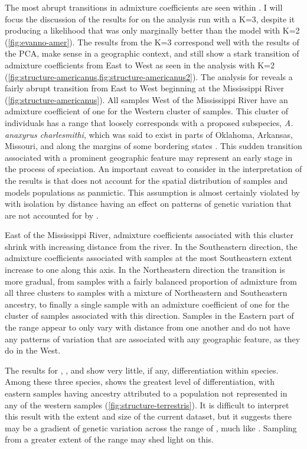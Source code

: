The most abrupt transitions in admixture coefficients are seen within \amer.
I will focus the discussion of the \structure results for \amer on the 
analysis run with a K=3, despite it producing a likelihood that was only 
marginally better than the model with K=2 (\cref{fig:evanno-amer}).
The results from the K=3 correspond well with the results of 
the PCA, make sense in a geographic context, and still show a stark 
transition of admixture coefficients from East to West as seen in the analysis 
with K=2 (\cref{fig:structure-americanus,fig:structure-americanus2}).
The \structure analysis for \amer reveals a fairly abrupt transition from East
to West beginning at the Mississippi River (\cref{fig:structure-americanus}).
All samples West of the Mississippi River have an admixture coefficient of one for the 
Western cluster of samples.
This cluster of individuals has a range that loosely corresponds with a proposed
subspecies, \textit{A. anaxyrus charlesmithi}, which was said to exist in parts  
of Oklahoma, Arkansas, Missouri, and along the margins of some bordering states 
\parencite{bragg1954}.
This sudden transition associated with a prominent geographic feature 
may represent an early stage in the process of speciation.
An important caveat to consider in the interpretation of the \structure results
is that \structure does not account for the spatial distribution of samples and
models populations as panmictic.
This assumption is almost certainly violated by \amer with isolation by distance
having an effect on patterns of genetic variation that are not accounted for by
\structure. 


East of the Mississippi River, admixture coefficients associated with this cluster
shrink with increasing distance from the river. 
In the Southeastern direction, the admixture coefficients associated with samples
at the most Southeastern extent increase to one along this axis.
In the Northeastern direction the transition is more gradual, from samples with 
a fairly balanced proportion of admixture from all three clusters to samples  
with a mixture of Northeastern and Southeastern ancestry, to finally a single
sample with an admixture coefficient of one for the cluster of samples associated
with this direction.
Samples in the Eastern part of the \amer range appear to only vary with distance 
from one another and do not have any patterns of variation that are associated 
with any geographic feature, as they do in the West.


The \structure results for \fowl, \terr, and \wood show very little, if any,
differentiation within species.
Among these three species, \terr shows the greatest level of differentiation, 
with eastern samples having ancestry attributed to a population not represented 
in any of the western samples (\cref{fig:structure-terrestris}). 
It is difficult to interpret this result with the extent and size of the 
current dataset, but it suggests there may be a gradient of genetic variation
across the range of \terr, much like \amer. 
Sampling from a greater extent of the \terr
range may shed light on this.  

